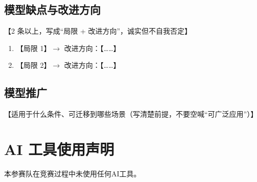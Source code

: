 \documentclass[12pt,a4paper,fontset=windows]{ctexart}
\begin{document}
\subsection{模型缺点与改进方向}
【2 条以上，写成“局限 + 改进方向”，诚实但不自我否定】
\begin{enumerate}
  \item 【局限 1】$\rightarrow$ 改进方向：【……】
  \item 【局限 2】$\rightarrow$ 改进方向：【……】
\end{enumerate}

\subsection{模型推广}
【适用于什么条件、可迁移到哪些场景（写清楚前提，不要空喊“可广泛应用”）】

\section*{AI 工具使用声明}

本参赛队在竞赛过程中未使用任何AI工具。



\end{document}

